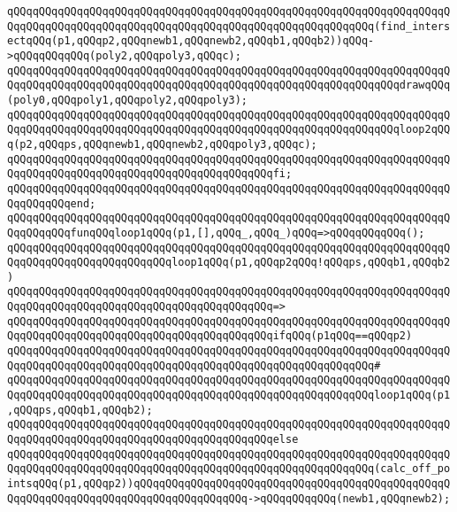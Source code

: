 \verb|qQQqqQQqqQQqqQQqqQQqqQQqqQQqqQQqqQQqqQQqqQQqqQQqqQQqqQQqqQQqqQQqqQQqqQQqqQQqqQQqqQQqqQQqqQQqqQQqqQQqqQQqqQQqqQQqqQQqqQQqqQQqqQQq(find_intersectqQQq(p1,qQQqp2,qQQqnewb1,qQQqnewb2,qQQqb1,qQQqb2))qQQq->qQQqqQQqqQQq(poly2,qQQqpoly3,qQQqc);|\newline
\newline
\verb|qQQqqQQqqQQqqQQqqQQqqQQqqQQqqQQqqQQqqQQqqQQqqQQqqQQqqQQqqQQqqQQqqQQqqQQqqQQqqQQqqQQqqQQqqQQqqQQqqQQqqQQqqQQqqQQqqQQqqQQqqQQqqQQqqQQqdrawqQQq(poly0,qQQqpoly1,qQQqpoly2,qQQqpoly3);|\newline
\newline
\verb|qQQqqQQqqQQqqQQqqQQqqQQqqQQqqQQqqQQqqQQqqQQqqQQqqQQqqQQqqQQqqQQqqQQqqQQqqQQqqQQqqQQqqQQqqQQqqQQqqQQqqQQqqQQqqQQqqQQqqQQqqQQqqQQqqQQqloop2qQQq(p2,qQQqps,qQQqnewb1,qQQqnewb2,qQQqpoly3,qQQqc);|\newline
\verb|qQQqqQQqqQQqqQQqqQQqqQQqqQQqqQQqqQQqqQQqqQQqqQQqqQQqqQQqqQQqqQQqqQQqqQQqqQQqqQQqqQQqqQQqqQQqqQQqqQQqqQQqqQQqqQQqfi;|\newline
\verb|qQQqqQQqqQQqqQQqqQQqqQQqqQQqqQQqqQQqqQQqqQQqqQQqqQQqqQQqqQQqqQQqqQQqqQQqqQQqqQQqend;|\newline
\newline
\verb|qQQqqQQqqQQqqQQqqQQqqQQqqQQqqQQqqQQqqQQqqQQqqQQqqQQqqQQqqQQqqQQqqQQqqQQqqQQqqQQqfunqQQqloop1qQQq(p1,[],qQQq_,qQQq_)qQQq=>qQQqqQQqqQQq();|\newline
\verb|qQQqqQQqqQQqqQQqqQQqqQQqqQQqqQQqqQQqqQQqqQQqqQQqqQQqqQQqqQQqqQQqqQQqqQQqqQQqqQQqqQQqqQQqqQQqqQQqloop1qQQq(p1,qQQqp2qQQq!qQQqps,qQQqb1,qQQqb2)|\newline
\verb|qQQqqQQqqQQqqQQqqQQqqQQqqQQqqQQqqQQqqQQqqQQqqQQqqQQqqQQqqQQqqQQqqQQqqQQqqQQqqQQqqQQqqQQqqQQqqQQqqQQqqQQqqQQqqQQq=>|\newline
\verb|qQQqqQQqqQQqqQQqqQQqqQQqqQQqqQQqqQQqqQQqqQQqqQQqqQQqqQQqqQQqqQQqqQQqqQQqqQQqqQQqqQQqqQQqqQQqqQQqqQQqqQQqqQQqqQQqifqQQq(p1qQQq==qQQqp2)|\newline
\verb|qQQqqQQqqQQqqQQqqQQqqQQqqQQqqQQqqQQqqQQqqQQqqQQqqQQqqQQqqQQqqQQqqQQqqQQqqQQqqQQqqQQqqQQqqQQqqQQqqQQqqQQqqQQqqQQqqQQqqQQqqQQqqQQq#|\newline
\verb|qQQqqQQqqQQqqQQqqQQqqQQqqQQqqQQqqQQqqQQqqQQqqQQqqQQqqQQqqQQqqQQqqQQqqQQqqQQqqQQqqQQqqQQqqQQqqQQqqQQqqQQqqQQqqQQqqQQqqQQqqQQqqQQqloop1qQQq(p1,qQQqps,qQQqb1,qQQqb2);|\newline
\verb|qQQqqQQqqQQqqQQqqQQqqQQqqQQqqQQqqQQqqQQqqQQqqQQqqQQqqQQqqQQqqQQqqQQqqQQqqQQqqQQqqQQqqQQqqQQqqQQqqQQqqQQqqQQqqQQqelse|\newline
\verb|qQQqqQQqqQQqqQQqqQQqqQQqqQQqqQQqqQQqqQQqqQQqqQQqqQQqqQQqqQQqqQQqqQQqqQQqqQQqqQQqqQQqqQQqqQQqqQQqqQQqqQQqqQQqqQQqqQQqqQQqqQQqqQQq(calc_off_pointsqQQq(p1,qQQqp2))qQQqqQQqqQQqqQQqqQQqqQQqqQQqqQQqqQQqqQQqqQQqqQQqqQQqqQQqqQQqqQQqqQQqqQQqqQQqqQQqqQQqqQQq->qQQqqQQqqQQq(newb1,qQQqnewb2);|\newline
